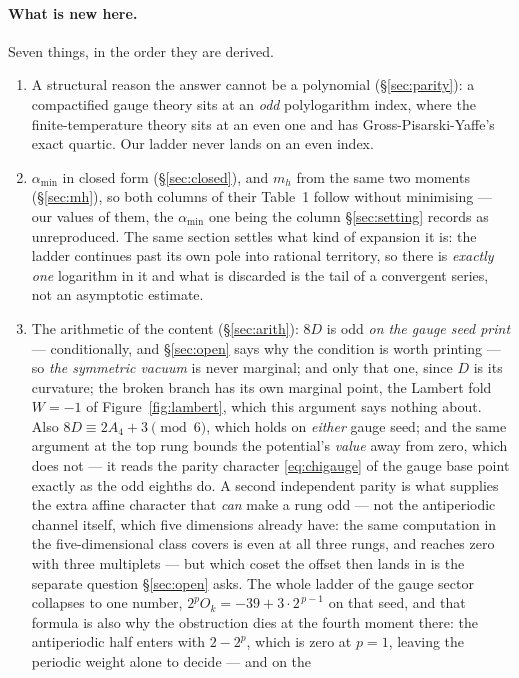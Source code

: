 \documentclass[11pt,a4paper]{article}
\newcommand{\amin}{\alpha_{\min}}
\begin{document}
\paragraph{What is new here.} Seven things, in the order they are derived.
\begin{enumerate}\itemsep2pt
\item A structural reason the answer cannot be a polynomial (\S\ref{sec:parity}): a compactified
gauge theory sits at an \emph{odd} polylogarithm index, where the finite-temperature theory sits at
an even one and has Gross-Pisarski-Yaffe's exact quartic. Our ladder never lands on an even index.
\item $\amin$ in closed form (\S\ref{sec:closed}), and $m_h$ from the same two moments
(\S\ref{sec:mh}), so both columns of their Table~1 follow without minimising --- our values of
them, the $\amin$ one being the column \S\ref{sec:setting} records as unreproduced. The same section
settles what kind of expansion it is: the ladder continues past its own pole into rational
territory, so there is \emph{exactly one} logarithm in it and what is discarded is the tail of a
convergent series, not an asymptotic estimate.
\item The arithmetic of the content (\S\ref{sec:arith}): $8D$ is odd \emph{on the gauge seed
\cite{KM25} print} --- conditionally, and \S\ref{sec:open} says why the condition is worth
printing --- so \emph{the symmetric
vacuum} is never marginal; and only that one, since $D$ is its curvature; the broken branch has
its own marginal point, the Lambert fold $W=-1$ of Figure~\ref{fig:lambert}, which this argument
says nothing about. Also $8D\equiv 2A_4+3\pmod 6$, which holds on \emph{either} gauge seed; and the same argument at
the top rung bounds the potential's \emph{value} away from zero, which does not --- it reads the
parity character \eqref{eq:chigauge} of the gauge base point exactly as the odd eighths do. A second
independent parity is what supplies the extra affine character that \emph{can} make a rung odd ---
not the antiperiodic channel itself, which five dimensions already have: the same computation in
the five-dimensional class \cite{HY04} covers is even at all three rungs, and reaches zero with
three multiplets --- but which coset the offset then lands in
is the separate question \S\ref{sec:open} asks. The whole ladder
of the gauge sector collapses to one number, $2^{p}O_k=-39+3\cdot2^{\,p-1}$ on that seed, and that
formula is also why the obstruction dies at the fourth moment there: the antiperiodic half enters
with $2-2^{p}$, which is zero at $p=1$, leaving the periodic weight alone to decide --- and on the

\end{enumerate}
\end{document}
